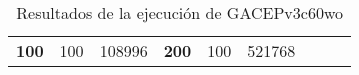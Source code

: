 \begin{table}[H]
\begin{tabular}{|ccrccrccc}
\multicolumn{1}{|c|}{\multirow{-39}{*}{\cellcolor[HTML]{FFFFC7}\textbf{100}}} & \multicolumn{1}{c|}{\multirow{-9}{*}{\cellcolor[HTML]{DDFDFF}100}} & \multicolumn{1}{r|}{\cellcolor[HTML]{DAE8FC}108996}    & \multicolumn{1}{c|}{\multirow{-39}{*}{\cellcolor[HTML]{FFFFC7}\textbf{200}}} & \multicolumn{1}{c|}{\multirow{-10}{*}{\cellcolor[HTML]{DDFDFF}100}} & \multicolumn{1}{r|}{\cellcolor[HTML]{DDFDFF}521768}    &                                                                              &                                                                    &                                                        \\ \cline{1-6}
\end{tabular}
\caption{\label{GACEPv3c60woGRASP}Resultados de la ejecución de GACEPv3c60wo}
\end{table}

